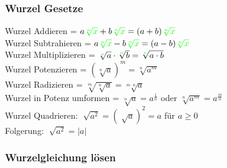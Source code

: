 \begin{multicols}{2}
    \subsubsection{Wurzel Gesetze}
    \vspace{-4mm}
    Wurzel Addieren = $a{\color{green}\sqrt[n]{x}} + b{\color{green}\sqrt[n]{x}} = (a + b){\color{green}\sqrt[n]{x}}$ \\
    Wurzel Subtrahieren = $a {\color{green}\sqrt[n]{x}} - b{\color{green}\sqrt[n]{x}} = (a - b){\color{green}\sqrt[n]{x}}$ \\
    Wurzel Multiplizieren = $\sqrt[{\color{green}n}]{a} \cdot \sqrt[{\color{green}n}]{b} = \sqrt[{\color{green}n}]{a \cdot b}$ \\
    Wurzel Potenzieren = $(\sqrt[n]{a})^m = \sqrt[n]{a^m}$ \\
    Wurzel Radizieren = $\sqrt[m]{\sqrt[n]{a}} = \sqrt[m \cdot n]{a}$ \\
    Wurzel in Potenz umformen = $\sqrt[n]{a} = a^{\frac{1}{n}}$ oder $\sqrt[n]{a^m} = a^{\frac{m}{n}}$ \\
    Wurzel Quadrieren: $\sqrt[]{a^2} = {(\sqrt[]{a})}^2 = a$ für $a \geq 0$ \\
    Folgerung: $\sqrt[]{a^2} = |a|$

    \subsubsection{Wurzelgleichung lösen}
    \vspace{-4mm}


\end{multicols}
